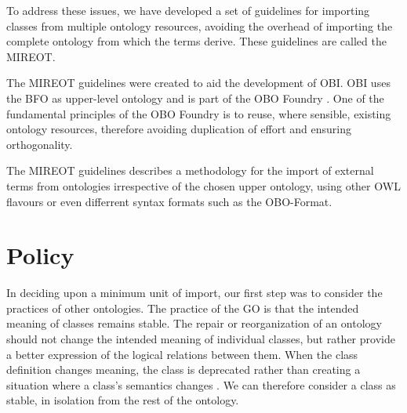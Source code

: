 \documentclass[a4paper,10pt,twocolumn]{article}
\begin{document}

To address these issues, we have developed a set of guidelines for importing classes from multiple ontology resources, avoiding the overhead of importing the complete ontology from which the terms derive. These guidelines are called the \ac{MIREOT}.


The \ac{MIREOT} guidelines were created to aid the development of \ac{OBI}\cite{RefWorks:1507}.
\ac{OBI} uses the \ac{BFO} \cite{RefWorks:1557} as upper-level ontology and is part of the \ac{OBO} Foundry \cite{RefWorks:1472}. 
One of the fundamental principles of the \ac{OBO} Foundry is to reuse, where sensible, existing ontology resources, therefore avoiding duplication of effort and ensuring orthogonality.


The \ac{MIREOT} guidelines describes a methodology for the import of external terms from ontologies irrespective of the chosen upper ontology, using other \ac{OWL} flavours or even differrent syntax formats such as the \ac{OBO}-Format.
\section*{Policy}

In deciding upon a minimum unit of import, our first step was to consider the practices of other ontologies.
The practice of the \ac{GO} \cite{RefWorks:79} is that the intended meaning of classes remains stable.
The repair or reorganization of an ontology should not change the intended meaning of individual classes, but rather provide a better expression of the logical relations between them.
When the class definition changes meaning, the class is deprecated rather than creating a situation where a class's semantics changes \cite{RefWorks:1560}.
We can therefore consider a class as stable, in isolation from the rest of the ontology. 

\end{document}
